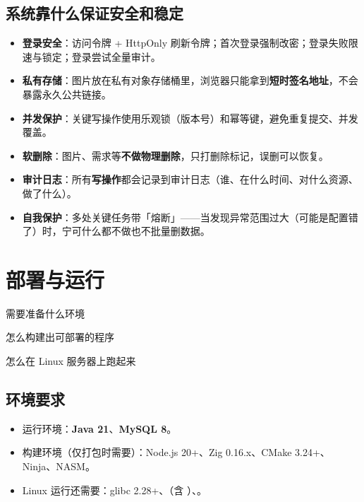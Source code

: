 \documentclass[cn,11pt,green]{elegantbook}
\begin{document}
\section{系统靠什么保证安全和稳定}

\begin{itemize}
  \item \textbf{登录安全}：访问令牌 + HttpOnly 刷新令牌；首次登录强制改密；登录失败限速与锁定；登录尝试全量审计。
  \item \textbf{私有存储}：图片放在私有对象存储桶里，浏览器只能拿到\textbf{短时签名地址}，不会暴露永久公共链接。
  \item \textbf{并发保护}：关键写操作使用乐观锁（版本号）和幂等键，避免重复提交、并发覆盖。
  \item \textbf{软删除}：图片、需求等\textbf{不做物理删除}，只打删除标记，误删可以恢复。
  \item \textbf{审计日志}：所有\textbf{写操作}都会记录到审计日志（谁、在什么时间、对什么资源、做了什么）。
  \item \textbf{自我保护}：多处关键任务带「熔断」——当发现异常范围过大（可能是配置错了）时，宁可什么都不做也不批量删数据。
\end{itemize}

\chapter{部署与运行}

\begin{introduction}
  \item 需要准备什么环境
  \item 怎么构建出可部署的程序
  \item 怎么在 Linux 服务器上跑起来
\end{introduction}

\section{环境要求}

\begin{itemize}
  \item 运行环境：\textbf{Java 21}、\textbf{MySQL 8}。
  \item 构建环境（仅打包时需要）：Node.js 20+、Zig 0.16.x、CMake 3.24+、Ninja、NASM。
  \item Linux 运行还需要：glibc 2.28+、（含 ）、。
\end{itemize}
\end{document}
